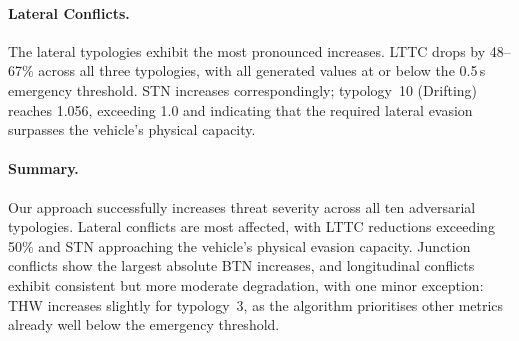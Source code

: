 \paragraph{Lateral Conflicts.}
The lateral typologies exhibit the most pronounced increases. LTTC drops by 48--67\% across all three typologies, with all generated values at or below the 0.5\,s emergency threshold. STN increases correspondingly; typology~10 (Drifting) reaches 1.056, exceeding 1.0 and indicating that the required lateral evasion surpasses the vehicle's physical capacity.

\paragraph{Summary.}
Our approach successfully increases threat severity across all ten adversarial typologies. Lateral conflicts are most affected, with LTTC reductions exceeding 50\% and STN approaching the vehicle's physical evasion capacity. Junction conflicts show the largest absolute BTN increases, and longitudinal conflicts exhibit consistent but more moderate degradation, with one minor exception: THW increases slightly for typology~3, as the algorithm prioritises other metrics already well below the emergency threshold.

